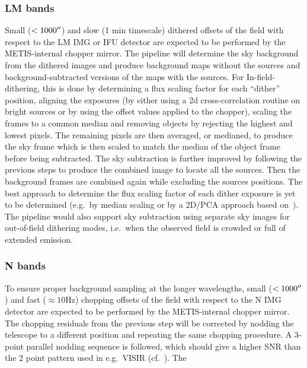 \subsubsection{LM bands}
Small ($< 1000 \hbox{$^{\prime\prime}$}$) and slow (1 min timescale) dithered offsets of the field with respect to the LM IMG or \ac{IFU} detector are expected to be performed by the METIS-internal chopper mirror.
The pipeline will determine the sky background from the dithered images and produce background maps without the sources and background-subtracted versions of the maps with the sources.
For In-field-dithering, this is done by determining a flux scaling factor for each ``dither'' position, aligning the exposures (by either using a 2d cross-correlation routine on bright sources or by using the offset values applied to the chopper), scaling the frames to a common median and removing objects by rejecting the highest and lowest pixels.
The remaining pixels are then averaged, or medianed, to produce the sky frame which is then scaled to match the median of the object frame before being subtracted.
The sky subtraction is further improved by following the previous steps to produce the combined image to locate all the sources.
Then the background frames are combined again while excluding the sources positions.
The best approach to determine the flux scaling factor of each dither exposure is yet to be determined (e.g.\ by median scaling or by a 2D/PCA approach based on~\cite{Hunziker2018}).
The pipeline would also support sky subtraction using separate sky images for out-of-field dithering modes, i.e.\ when the observed field is crowded or full of extended emission.

\subsubsection{N bands}\label{sssec:nbandsbackgroundsubtracion}
To ensure proper background sampling at the longer wavelengths, small ($< 1000 \hbox{$^{\prime\prime}$}$) and fast ($\approx 10 \mathrm{Hz}$) chopping offsets of the field with respect to the N IMG detector are expected to be performed by the METIS-internal chopper mirror.
The chopping residuals from the previous step will be corrected by nodding the telescope to a different position and repeating the same chopping procedure.
A 3-point parallel nodding sequence is followed, which should give a higher \ac{SNR} than the 2 point pattern used in e.g.~VISIR (cf.~\cite{METIS-operational_concept}).
The

